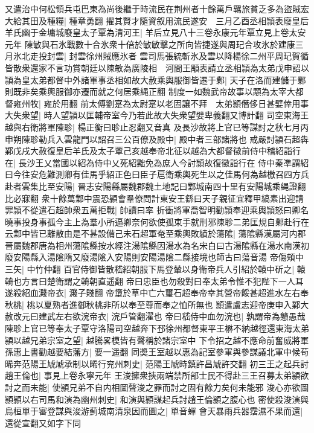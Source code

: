 又遣治中何松領兵屯巴東為尚後繼于時流民在荆州者十餘萬戶羈旅貧乏多為盜賊宏大給其田及種糧|{
	種章勇翻}
擢其賢才隨資叙用流民遂安　三月乙酉丞相頴表廢皇后羊氏幽于金墉城廢皇太子覃為清河王|{
	羊后立見八十三卷永康元年覃立見上卷太安元年}
陳敏與石氷戰數十合氷衆十倍於敏敏擊之所向皆捷遂與周玘合攻氷於建康三月氷北走投封雲|{
	封雲徐州賊應氷者}
雲司馬張統斬氷及雲以降楊徐二州平周玘賀循皆散衆還家不言功賞朝廷以陳敏為廣陵相　河間王顒表請立丞相頴為太弟戊申詔以頴為皇太弟都督中外諸軍事丞相如故大赦乘輿服御皆遷于鄴|{
	天子在洛而建儲于鄴則既非矣乘輿服御亦遷而就之何居乘䋲正翻}
制度一如魏武帝故事以顒為太宰大都督雍州牧|{
	雍於用翻}
前太傅劉寔為太尉寔以老固讓不拜　太弟頴僭侈日甚嬖倖用事大失衆望|{
	時人望頴以匡輔帝室今乃若此故大失衆望嬖卑義翻又博計翻}
司空東海王越與右衛將軍陳聄|{
	楊正衡曰聄止忍翻又音真}
及長沙故將上官已等謀討之秋七月丙申朔陳聄勒兵入雲龍門以詔召三公百僚及殿中|{
	殿中者三部諸將也}
戒嚴討頴石超犇鄴戊戌大赦復皇后羊氏及太子覃己亥越奉帝北征以越為大都督徵前侍中稽紹詣行在|{
	長沙王乂當國以紹為侍中乂死紹黜免為庶人今討頴故復徵詣行在}
侍中秦凖謂紹曰今往安危難測卿有佳馬乎紹正色曰臣子扈衛乘輿死生以之佳馬何為越檄召四方兵赴者雲集比至安陽|{
	晉志安陽縣屬魏郡魏土地記曰鄴城南四十里有安陽城乘䋲證翻比必寐翻}
衆十餘萬鄴中震恐頴會羣僚問計東安王繇曰天子親征宜釋甲縞素出迎請罪頴不從遣石超帥衆五萬拒戰|{
	帥讀曰率}
折衝將軍喬智明勸頴奉迎乘輿頴怒曰卿名曉事投身事孤今主上為羣小所逼卿奈何欲使孤束手就刑邪陳聄二弟匡規自鄴赴行在云鄴中皆已離散由是不甚設備己未石超軍奄至乘輿敗績於蕩隂|{
	蕩隂縣漢屬河内郡晉屬魏郡唐為相州蕩隂縣按水經注湯隂縣因湯水為名宋白曰古湯隂縣在湯水南漢初廢安陽縣入湯隂隋又廢湯隂入安陽則安陽湯隂二縣接境也師古曰蕩音湯}
帝傷頰中三矢|{
	中竹仲翻}
百官侍御皆散嵇紹朝服下馬登輦以身衛帝兵人引紹於轅中斫之|{
	轅輈也方言曰楚衛謂之輈朝直遥翻}
帝曰忠臣也勿殺對曰奉太弟令惟不犯陛下一人耳遂殺紹血濺帝衣|{
	濺子賤翻}
帝墯於草中亡六璽石超奉帝幸其營帝餒甚超進水左右奉秋桃|{
	桃以夏熟者進御秋桃非所以奉至尊而奉之恤所無也}
頴遣盧志迎帝庚申入鄴大赦改元曰建武左右欲浣帝衣|{
	浣戶管翻濯也}
帝曰嵇侍中血勿浣也|{
	孰謂帝為戇愚哉}
陳聄上官已等奉太子覃守洛陽司空越奔下邳徐州都督東平王楙不納越徑還東海太弟頴以越兄弟宗室之望|{
	越騰畧模皆有聲稱於諸宗室中}
下令招之越不應命前奮威將軍孫惠上書勸越要結藩方|{
	要一遥翻}
同奬王室越以惠為記室參軍與參謀議北軍中候苟晞奔范陽王虓虓承制以晞行兖州刺史|{
	范陽王虓時鎮許昌虓許交翻}
初三王之起兵討趙王倫也|{
	事見上卷永寧元年}
王浚擁衆挾兩端禁所部士民不得赴三王召募太弟頴欲討之而未能|{
	使頴兄弟不自内相圖聲浚之罪而討之固有餘力矣何未能邪}
浚心亦欲圖頴頴以右司馬和演為幽州刺史|{
	和演與頴謀起兵討趙王倫頴之腹心也}
密使殺浚演與烏桓單于審登謀與浚游薊城南清泉因而圖之|{
	單音蟬}
會天暴雨兵器霑濕不果而還|{
	還從宣翻又如字下同}
